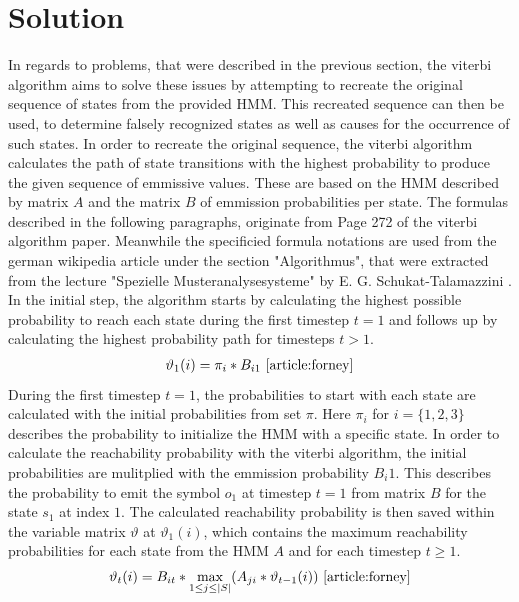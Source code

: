 \documentclass[12pt,journal,compsoc]{IEEEtran}
\begin{document}
\section{Solution}
In regards to problems, that were described in the previous section, the viterbi algorithm aims to solve these issues
by attempting to recreate the original sequence of states from the provided HMM. This recreated sequence can then be
used, to determine falsely recognized states as well as causes for the occurrence of such states.
In order to recreate the original sequence, the viterbi algorithm calculates the path of state transitions with the
highest probability to produce the given sequence of emmissive values. These are based on the HMM described by matrix $A$ and
the matrix $B$ of emmission probabilities per state. The formulas described in the following paragraphs, originate from Page 272 of
the viterbi algorithm \cite{article:forney} paper. Meanwhile the specificied formula notations are used from the german
wikipedia article \cite{wiki:viterbi} under the section "Algorithmus", that were extracted from the lecture
"Spezielle Musteranalysesysteme" by E. G. Schukat-Talamazzini \cite{lecture:patternAnalysis}. In the initial step, the algorithm starts by calculating the
highest possible probability to reach each state during the first timestep $t=1$ and follows up by calculating the
highest probability path for timesteps $t > 1$.
\begin{align*}
	\displaystyle \vartheta_{1}(i)=\pi_{i}*B_{i1} \text{ \cite{article:forney}}
\end{align*}
During the first timestep $t=1$, the probabilities to start with each state are calculated with the initial probabilities from set $\pi$.
Here $\pi_{i}$ for $i=\{1,2,3\}$ describes the probability to initialize the HMM with a specific state. In order to calculate the reachability
probability with the viterbi algorithm, the initial probabilities are mulitplied with the emmission probability $B_{i}1$.
This describes the probability to emit the symbol $o_1$ at timestep $t=1$ from matrix $B$ for the state $s_1$ at index $1$. The calculated
reachability probability is then saved within the variable matrix $\vartheta$ at $\vartheta_{1}(i)$, which contains the maximum reachability probabilities
for each state from the HMM $A$ and for each timestep $t \geq 1$.
\begin{align*}
	\displaystyle \vartheta_{t}(i)=B_{it}*\max_{1\leq j\leq\mid S\mid}(A_{ji}*\vartheta_{t-1}(i)) \text{ \cite{article:forney}}
\end{align*}
\end{document}
